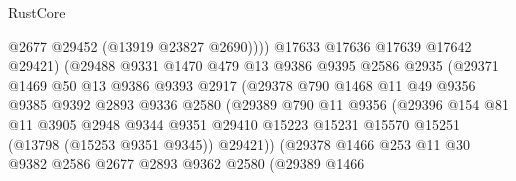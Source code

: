 \begin{lexlean}{RustCore}
\begin{coremodule}
                                  @2677
                                  @29452
                                  (@13919 @23827 @2690))))
                            @17633
                            @17636
                            @17639
                            @17642
                            @29421)
                          (@29488
                            @9331
                            @1470
                            @479
                            @13
                            @9386
                            @9395
                            @2586
                            @2935
                            (@29371
                              @1469
                              @50
                              @13
                              @9386
                              @9393
                              @2917
                              (@29378
                                @790
                                @1468
                                @11
                                @49
                                @9356
                                @9385
                                @9392
                                @2893
                                @9336
                                @2580
                                (@29389
                                  @790
                                  @11
                                  @9356
                                  (@29396
                                    @154
                                    @81
                                    @11
                                    @3905
                                    @2948
                                    @9344
                                    @9351
                                    @29410
                                    @15223
                                    @15231
                                    @15570
                                    @15251
                                    (@13798 (@15253 @9351 @9345))
                                    @29421))
                                (@29378
                                  @1466
                                  @253
                                  @11
                                  @30
                                  @9382
                                  @2586
                                  @2677
                                  @2893
                                  @9362
                                  @2580
                                  (@29389
                                    @1466

\end{coremodule}
\end{lexlean}
